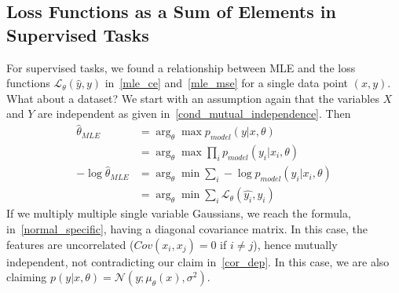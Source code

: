 \documentclass{book}
\numberwithin{equation}{subsection}
\begin{document}
\subsection{Loss Functions as a Sum of Elements in Supervised Tasks}
For supervised tasks, we found a relationship between MLE and the loss functions $\mathcal{L}_\theta(\hat{y},y)$ in~\ref{mle_ce} and~\ref{mle_mse} for a single data point $(x,y)$. What about a dataset? We start with an assumption again that the variables $X$ and $Y$ are independent as given in~\ref{cond_mutual_independence}. Then 
\begin{align}
    \hat{\theta}_{MLE} 
    &= \arg_\theta \max p_{model}(y|x,\theta)\\
    &= \arg_\theta \max \prod_i p_{model}(y_i|x_i,\theta)\\
    -\log\hat{\theta}_{MLE}
    &= \arg_\theta \min \sum_i -\log p_{model}(y_i|x_i,\theta)\\
    &= \arg_\theta \min \sum_i \mathcal{L}_\theta(\hat{y_i},y_i)\label{loss_sum_res}
\end{align}
If we multiply multiple single variable Gaussians, we reach the formula, in~\ref{normal_specific}, having a diagonal covariance matrix. In this case, the features are uncorrelated ($Cov(x_i,x_j)=0$ if $i \neq j$), hence mutually independent, not contradicting our claim in~\ref{cor_dep}. In this case, we are also claiming $p(y|x,\theta)=\mathcal{N}(y; \mu_\theta(x),\sigma^2)$.
\end{document}
